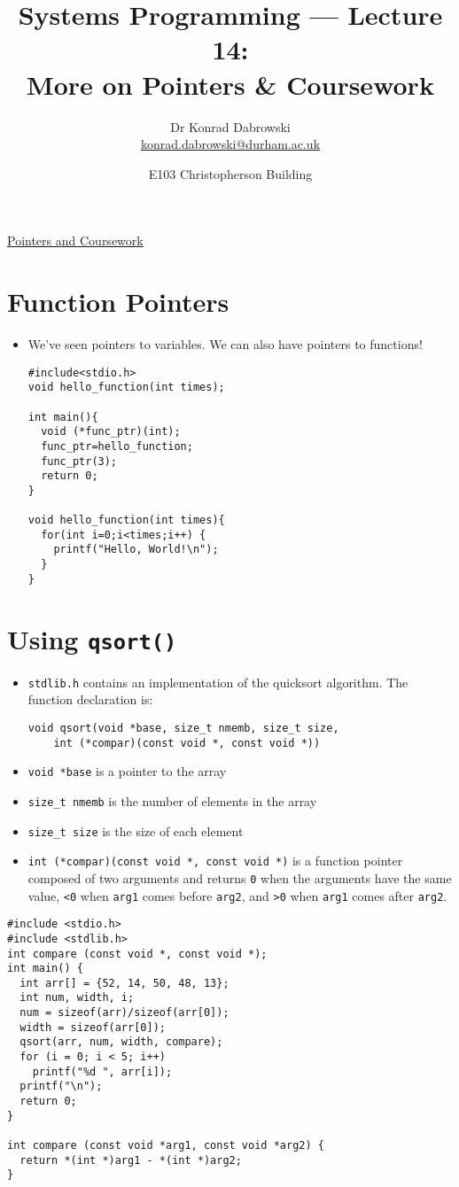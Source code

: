\documentclass{article}
\title{Systems Programming --- Lecture 14:\\
More on Pointers \& Coursework}
\author{Dr Konrad Dabrowski\\
\href{mailto://konrad.dabrowski@durham.ac.uk}{konrad.dabrowski@durham.ac.uk}
}
\date{E103 Christopherson Building}
\begin{document}
\begin{center}
	\underline{\huge Pointers and Coursework}
\end{center}



\section{Function Pointers}
\begin{itemize}
\item We've seen pointers to variables. We can also have pointers to functions!
\begin{verbatim}
#include<stdio.h>
void hello_function(int times);

int main(){
  void (*func_ptr)(int);
  func_ptr=hello_function;
  func_ptr(3);
  return 0;
}

void hello_function(int times){
  for(int i=0;i<times;i++) {
    printf("Hello, World!\n");
  }
}
\end{verbatim}
\end{itemize}



\section{Using \texttt{qsort()}}
\begin{itemize}
\item \verb!stdlib.h! contains an implementation of the quicksort algorithm. The function declaration is:
\begin{verbatim}
void qsort(void *base, size_t nmemb, size_t size,
    int (*compar)(const void *, const void *)) 
\end{verbatim}
\item \verb!void *base! is a pointer to the array
\item \verb!size_t nmemb! is the number of elements in the array
\item \verb!size_t size! is the size of each element
\item \verb!int (*compar)(const void *, const void *)! is a function pointer composed of two arguments and returns \verb!0! when the arguments have the same value, \verb!<0! when \verb!arg1! comes before \verb!arg2!, and \verb!>0! when \verb!arg1! comes after \verb!arg2!.
\end{itemize}



\begin{verbatim}
#include <stdio.h>
#include <stdlib.h>
int compare (const void *, const void *); 
int main() {
  int arr[] = {52, 14, 50, 48, 13};
  int num, width, i;
  num = sizeof(arr)/sizeof(arr[0]);
  width = sizeof(arr[0]);
  qsort(arr, num, width, compare);
  for (i = 0; i < 5; i++)
    printf("%d ", arr[i]);
  printf("\n");
  return 0;
}

int compare (const void *arg1, const void *arg2) {
  return *(int *)arg1 - *(int *)arg2;
}
\end{verbatim}
\end{document}
